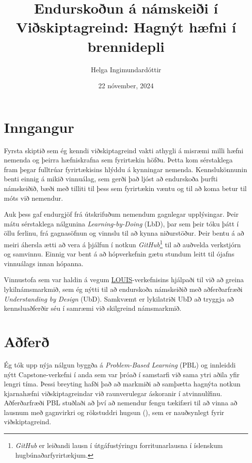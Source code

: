 \documentclass{kennsluakademia_conf}
\date{22 nóvember, 2024}
\title{Endurskoðun á námskeiði í Viðskiptagreind: Hagnýt hæfni í brennidepli}
\author{Helga Ingimundardóttir\autid{}{0000-0002-2780-3546}}
\affil{}{Iðnaðarverkfræðideild, Háskóli Íslands}
\begin{document}
\maketitle


\section{Inngangur}

Fyrsta skiptið sem ég kenndi viðskiptagreind vakti athygli á misræmi milli hæfni nemenda og þeirra hæfniskrafna sem fyrirtækin höfðu. Þetta kom sérstaklega fram þegar fulltrúar fyrirtækisins hlýddu á kynningar nemenda. Kennslukönnunin benti einnig á mikið vinnuálag, sem gerði það ljóst að endurskoða þurfti námskeiðið, bæði með tilliti til þess sem fyrirtækin væntu og til að koma betur til móts við nemendur.

Auk þess gaf endurgjöf frá útskrifuðum nemendum gagnlegar upplýsingar. Þeir mátu sérstaklega nálgunina \textit{Learning-by-Doing} (LbD), þar sem þeir tóku þátt í öllu ferlinu, frá gagnasöfnun og vinnslu til að kynna niðurstöður. Þeir bentu á að meiri áhersla ætti að vera á þjálfun í notkun \textit{GitHub}\footnote{\textit{GitHub} er leiðandi lausn í útgáfustýringu forritunarlausna í íslenskum hugbúnaðarfyrirtækjum.} til að auðvelda verkstjórn og samvinnu. Einnig var bent á að hópverkefnin gætu stundum leitt til ójafns vinnuálags innan hópanna.

Vinnustofa sem var haldin á vegum \href{https://aurora-universities.eu/louis/}{LOUIS}-verkefnisins hjálpaði til við að greina lykilnámsmarkmið, sem ég nýtti til að endurskoða námskeiðið með aðferðarfræði \textit{Understanding by Design} (UbD). Samkvæmt \cite{wiggins2005understanding} er lykilatriði UbD að tryggja að kennsluaðferðir séu í samræmi við skilgreind námsmarkmið.

\section{Aðferð}
Ég tók upp nýja nálgun byggða á \textit{Problem-Based Learning} (PBL) og innleiddi nýtt Capstone-verkefni í anda \cite{capstone} sem var þróað í samstarfi við sama ytri aðila yfir lengri tíma. Þessi breyting hafði það að markmiði að samþætta hagnýta notkun kjarnahæfni viðskiptagreindar við raunverulegar áskoranir í atvinnulífinu. Aðferðarfræði PBL stuðlaði að því að nemendur fengu tækifæri til að vinna að lausnum með gagnvirkri og rökstuddri hugsun (\cite{barrows1980problem}), sem er nauðsynlegt fyrir viðskiptagreind.
\end{document}
